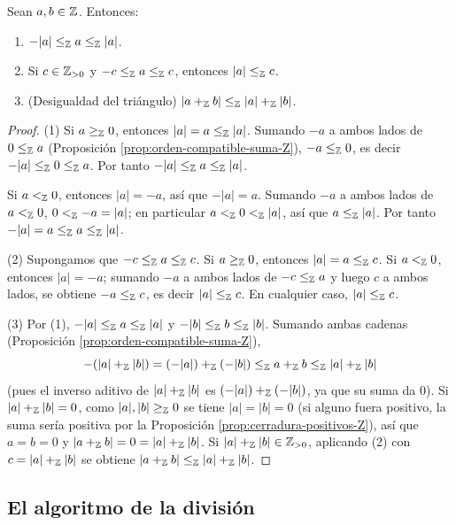 \documentclass[12pt,a4paper]{book}
\begin{document}
    \begin{lema}
        \label{lem:valor-absoluto-Z}
        Sean $a,b\in\mathbb{Z}$. Entonces:
        \begin{enumerate}
            \item[(1)] $-|a|\le_{\mathbb{Z}}a\le_{\mathbb{Z}}|a|$.
            \item[(2)] Si $c\in\mathbb{Z}_{>0}$ y $-c\le_{\mathbb{Z}}a\le_{\mathbb{Z}}c$, entonces $|a|\le_{\mathbb{Z}}c$.
            \item[(3)] (Desigualdad del triángulo) $|a+_{\mathbb{Z}}b|\le_{\mathbb{Z}}|a|+_{\mathbb{Z}}|b|$.
        \end{enumerate}
    \end{lema}
    \begin{proof}
        (1) Si $a\ge_{\mathbb{Z}}0$, entonces $|a|=a\le_{\mathbb{Z}}|a|$. Sumando $-a$ a ambos lados de $0\le_{\mathbb{Z}}a$ (Proposición \ref{prop:orden-compatible-suma-Z}), $-a\le_{\mathbb{Z}}0$, es decir $-|a|\le_{\mathbb{Z}}0\le_{\mathbb{Z}}a$. Por tanto $-|a|\le_{\mathbb{Z}}a\le_{\mathbb{Z}}|a|$.

        Si $a<_{\mathbb{Z}}0$, entonces $|a|=-a$, así que $-|a|=a$. Sumando $-a$ a ambos lados de $a<_{\mathbb{Z}}0$, $0<_{\mathbb{Z}}-a=|a|$; en particular $a<_{\mathbb{Z}}0<_{\mathbb{Z}}|a|$, así que $a\le_{\mathbb{Z}}|a|$. Por tanto $-|a|=a\le_{\mathbb{Z}}a\le_{\mathbb{Z}}|a|$.

        (2) Supongamos que $-c\le_{\mathbb{Z}}a\le_{\mathbb{Z}}c$. Si $a\ge_{\mathbb{Z}}0$, entonces $|a|=a\le_{\mathbb{Z}}c$. Si $a<_{\mathbb{Z}}0$, entonces $|a|=-a$; sumando $-a$ a ambos lados de $-c\le_{\mathbb{Z}}a$ y luego $c$ a ambos lados, se obtiene $-a\le_{\mathbb{Z}}c$, es decir $|a|\le_{\mathbb{Z}}c$. En cualquier caso, $|a|\le_{\mathbb{Z}}c$.

        (3) Por (1), $-|a|\le_{\mathbb{Z}}a\le_{\mathbb{Z}}|a|$ y $-|b|\le_{\mathbb{Z}}b\le_{\mathbb{Z}}|b|$. Sumando ambas cadenas (Proposición \ref{prop:orden-compatible-suma-Z}),
        \begin{equation*}
            -(|a|+_{\mathbb{Z}}|b|) = (-|a|)+_{\mathbb{Z}}(-|b|) \le_{\mathbb{Z}} a+_{\mathbb{Z}}b \le_{\mathbb{Z}} |a|+_{\mathbb{Z}}|b|
        \end{equation*}
        (pues el inverso aditivo de $|a|+_{\mathbb{Z}}|b|$ es $(-|a|)+_{\mathbb{Z}}(-|b|)$, ya que su suma da $0$). Si $|a|+_{\mathbb{Z}}|b|=0$, como $|a|,|b|\ge_{\mathbb{Z}}0$ se tiene $|a|=|b|=0$ (si alguno fuera positivo, la suma sería positiva por la Proposición \ref{prop:cerradura-positivos-Z}), así que $a=b=0$ y $|a+_{\mathbb{Z}}b|=0=|a|+_{\mathbb{Z}}|b|$. Si $|a|+_{\mathbb{Z}}|b|\in\mathbb{Z}_{>0}$, aplicando (2) con $c=|a|+_{\mathbb{Z}}|b|$ se obtiene $|a+_{\mathbb{Z}}b|\le_{\mathbb{Z}}|a|+_{\mathbb{Z}}|b|$.
    \end{proof}

    \subsection{El algoritmo de la división}
\end{document}
